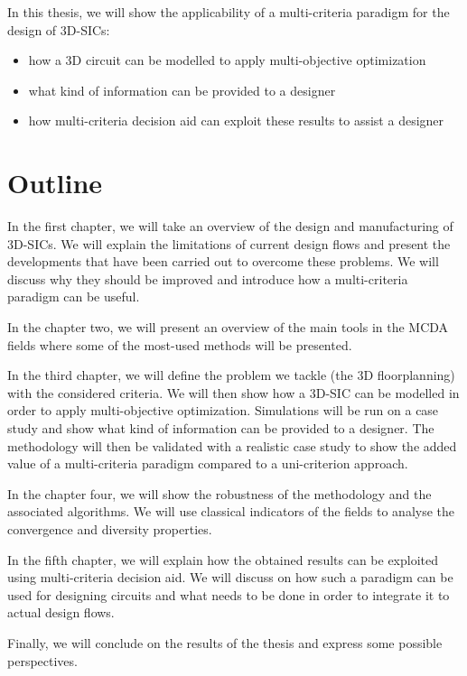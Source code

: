 In this thesis, we will show the applicability of a multi-criteria paradigm for the design of 3D-SICs:
\begin{itemize}
\item how a 3D circuit can be modelled to apply multi-objective optimization
\item what kind of information can be provided to a designer
\item how multi-criteria decision aid can exploit these results to assist a designer
\end{itemize}

\section*{Outline}
In the first chapter, we will take an overview of the design and manufacturing of 3D-SICs. We will explain the limitations of current design flows and present the developments that have been carried out to overcome these problems. We will discuss why they should be improved and introduce how a multi-criteria paradigm can be useful.

In the chapter two, we will present an overview of the main tools in the MCDA fields where some of the most-used methods will be presented.

In the third chapter, we will define the problem we tackle (the 3D floorplanning) with the considered criteria. We will then show how a 3D-SIC can be modelled in order to apply multi-objective optimization. Simulations will be run on a case study and show what kind of information can be provided to a designer. The methodology will then be validated with a realistic case study to show the added value of a multi-criteria paradigm compared to a uni-criterion approach.

In the chapter four, we will show the robustness of the methodology and the associated algorithms. We will use classical indicators of the fields to analyse the convergence and diversity properties.

In the fifth chapter, we will explain how the obtained results can be exploited using multi-criteria decision aid. We will discuss on how such a paradigm can be used for designing circuits and what needs to be done in order to integrate it to actual design flows.

Finally, we will conclude on the results of the thesis and express some possible perspectives.

